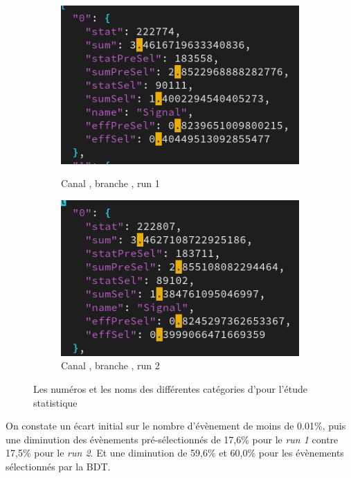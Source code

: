 \begin{figure}[!ht]
	\centering
	\begin{subfigure}[b]{0.45\textwidth}
		\includegraphics[width=\textwidth]{../img/stats_bb_original_run1_run1.png} 
		\label{stats:results:bb:original:1:1}
		\caption{Canal \bb, branche \original, run 1}
	\end{subfigure}
     \hfill
	\begin{subfigure}[b]{0.45\textwidth}
		\includegraphics[width=\textwidth]{../img/stats_bb_original_run2_run1.png}
		\caption{Canal \bb, branche \original, run 2}
		\label{stats:results:bb:original:2:1}
	\end{subfigure}
	\label{stats:results:img}
	\caption{Les numéros et les noms des différentes catégories d'\analysis pour l'étude statistique}
\end{figure}

On constate un écart initial sur le nombre d'évènement de moins de 0.01\%, puis une diminution des évènements pré-sélectionnés de 17,6\% pour le \textit{run 1} contre 17,5\% pour le \textit{run 2}. Et une diminution de 59,6\% et 60,0\% pour les évènements sélectionnés par la BDT. 

